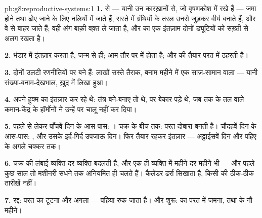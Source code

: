 \begin{solution}{pb:g8:reproductive-systems:1}
\textbf{1.}  से --- यानी उन कारख़ानों से, जो वृषणकोश में रखे हैं
---  जमा होने तथा ढोए जाने के लिए नलियों में जाते हैं, रास्ते
में ग्रंथियों के तरल उनसे जुड़कर वीर्य बनाते हैं, और वे  से बाहर
जाते हैं; वही अंग बाक़ी वक़्त  ले जाता है, और  का एक इंतज़ाम
दोनों ड्यूटियों को सख़्ती से अलग रखता है।

\textbf{2.} भंडार  में इंतज़ार करता है, जन्म से ही;  आम
तौर पर  में होता है; और   की तैयार परत में
ठहरती है।

\textbf{3.} दोनों  उलटी रणनीतियों पर बने हैं: लाखों सस्ते तैराक,
बनाम महीने में एक साज़-सामान वाला  --- यानी संख्या-बनाम-देखभाल,
ख़ुद  में लिखा हुआ।

\textbf{4.} अपने हुक्म का इंतज़ार कर रहे थे: तंत्र बने-बनाए तो थे, पर
बेकार पड़े थे, जब तक  के तल वाले कमान-केंद्र के हॉर्मोनों ने
उन्हें  पर चालू नहीं कर दिया।

\textbf{5.} पहले से लेकर पाँचवें दिन के आस-पास: । चक्र के बीच
तक: परत दोबारा बनती है। चौदहवें दिन के आस-पास: , और उसके
इर्द-गिर्द उपजाऊ दिन। फिर तैयार रहकर इंतज़ार --- अट्ठाईसवें दिन और
पहिए के अगले चक्कर तक।

\textbf{6.} चक्र की लंबाई व्यक्ति-दर-व्यक्ति बदलती है, और एक ही व्यक्ति
में महीने-दर-महीने भी --- और पहले कुछ साल तो मशीनरी सधने तक अनियमित ही
चलते हैं। कैलेंडर ढर्रा सिखाता है, किसी की ठीक-ठीक तारीख़ें नहीं।

\textbf{7.} रद्द: परत का टूटना और अगला  --- पहिया रुक जाता
है। और शुरू:  का परत में जमना, तथा  के नौ महीने।


\end{solution}
